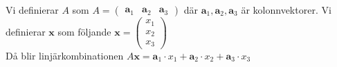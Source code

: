 Vi definierar $A$ som $A=\begin{pmatrix}\bm{a}_{1}&\bm{a}_{2}&\bm{a}_{3}\end{pmatrix}$
där $\bm{a}_{1},\bm{a}_{2},\bm{a}_{3}$ är kolonnvektorer.
Vi definierar $\bm{x}$ som följande $\bm{x}=\begin{pmatrix}x_{1}\\x_{2}\\x_{3}\end{pmatrix}$\\
Då blir linjärkombinationen $A\bm{x}=\bm{a}_{1}\cdot x_{1}+\bm{a}_{2}\cdot x_{2}+\bm{a}_{3}\cdot x_{3}$